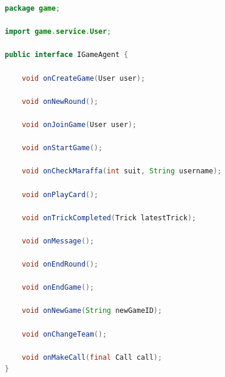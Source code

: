 \begin{lstlisting}[language=Java, caption={Interfaccia per gestire chiamate websocket}, label=list:java_websocket_interface]
package game;

import game.service.User;

public interface IGameAgent {

	void onCreateGame(User user);

	void onNewRound();

	void onJoinGame(User user);

	void onStartGame();

	void onCheckMaraffa(int suit, String username);

	void onPlayCard();

	void onTrickCompleted(Trick latestTrick);

	void onMessage();

	void onEndRound();

	void onEndGame();

	void onNewGame(String newGameID);

	void onChangeTeam();

	void onMakeCall(final Call call);
}
\end{lstlisting}


